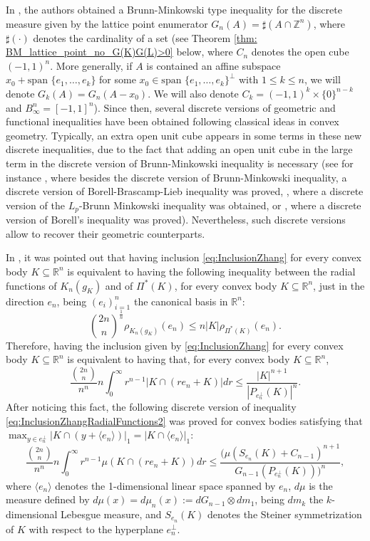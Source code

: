 \documentclass{amsart}
\newcommand{\R}{\mathbb R}
\newcommand{\Z}{\mathbb Z}
\theoremstyle{remark}
\theoremstyle{definition}
\numberwithin{equation}{section}
\begin{document}
In \cite{IYNZ}, the authors obtained a Brunn-Minkowski type inequality for the discrete measure given by the lattice point enumerator $G_n(A)=\sharp(A\cap\Z^n)$, where $\sharp (\cdot)$ denotes the cardinality of a set (see Theorem \ref{thm: BM_lattice_point_no_G(K)G(L)>0} below, where $C_n$ denotes the open cube $(-1,1)^n$. More generally, if $A$ is contained an affine subspace $x_0+\text{span } \{e_1, \ldots, e_k \}$ for some $x_0 \in \text{span } \{e_1, \ldots, e_k \}^{\perp}$ with $1\leq k\leq n$, we will denote $G_k(A)=G_n(A-x_0)$. We will also denote $C_k=(-1,1)^k\times\{0\}^{n-k}$ and $B_\infty^n=[-1,1]^n$). Since then, several discrete versions of geometric and functional inequalities have been obtained following classical ideas in convex geometry. Typically, an extra open unit cube appears in some terms in these new discrete inequalities, due to the fact that adding an open unit cube in the large term in the discrete version of Brunn-Minkowski inequality is necessary (see for instance \cite{IYNZ}, where besides the discrete version of Brunn-Minkowski inequality, a discrete version of Borell-Brascamp-Lieb inequality was proved, \cite{HLN}, where a discrete version of the $L_p$-Brunn Minkowski inequality was obtained, or \cite{AG}, where a discrete version of Borell's inequality was proved).  Nevertheless, such discrete versions allow to recover their geometric counterparts.

In \cite{ALM}, it was pointed out that having inclusion \eqref{eq:InclusionZhang} for every convex body $K\subseteq\R^n$ is equivalent to having the following inequality between the radial functions of $K_n(g_K)$ and of $\Pi^*(K)$, for every convex body $K\subseteq\R^n$, just in the direction $e_n$, being $(e_i)_{i=1}^n$ the canonical basis in $\R^n$:
\begin{equation}\label{eq:InclusionZhangRadialFunctions1}
{\binom{2n}{n}}^\frac{1}{n}\rho_{K_n(g_K)}(e_n)\leq n|K|\rho_{\Pi^*(K)}(e_n).
\end{equation}
Therefore, having the inclusion given by \eqref{eq:InclusionZhang} for every convex body $K\subseteq\R^n$ is equivalent to having that, for every convex body $K\subseteq\R^n$,
\begin{equation}\label{eq:InclusionZhangRadialFunctions2}
\frac{{\binom{2n}{n}}}{n^n}n\int_0^\infty r^{n-1}|K\cap(re_n+K)|dr\leq \frac{|K|^{n+1}}{|P_{e_n^\perp}(K)|^n}.
\end{equation}
After noticing this fact, the following discrete version of inequality \eqref{eq:InclusionZhangRadialFunctions2} was proved for convex bodies satisfying that $\displaystyle{\max_{y\in e_n^\perp}|K\cap (y+\langle e_n\rangle)|_1=|K\cap \langle e_n\rangle|_1}$:
\begin{equation}\label{eq:InequalityDiscreteZhang}
\frac{{\binom{2n}{n}}}{n^n}n\int_0^\infty r^{n-1}\mu(K\cap(re_n+K))dr\leq \frac{(\mu(S_{e_n}(K)+C_{n-1})^{n+1}}{G_{n-1}(P_{e_n^\perp}(K)))^n},
\end{equation}
where $\langle e_n\rangle$ denotes the 1-dimensional linear space spanned by $e_n$, $d\mu$ is the measure defined by $d\mu(x)=d\mu_n(x):=dG_{n-1}\otimes dm_1$, being $dm_k$ the $k$-dimensional Lebesgue measure, and $S_{e_n}(K)$ denotes the Steiner symmetrization of $K$ with respect to the hyperplane $e_n^\perp$.
\end{document}
